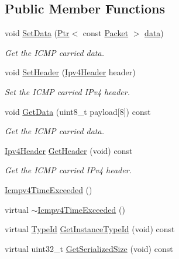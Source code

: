 \subsection*{Public Member Functions}
\begin{DoxyCompactItemize}
\item 
void \hyperlink{classns3_1_1Icmpv4TimeExceeded_ac692eb1bd4b5f80963cd673079a90be5}{Set\+Data} (\hyperlink{classns3_1_1Ptr}{Ptr}$<$ const \hyperlink{classns3_1_1Packet}{Packet} $>$ \hyperlink{topology-example-sim_8cc_a26c65296e316af77b787dc77469bb2a4}{data})
\begin{DoxyCompactList}\small\item\em Get the I\+C\+MP carried data. \end{DoxyCompactList}\item 
void \hyperlink{classns3_1_1Icmpv4TimeExceeded_a52300e282b6dc33501f1cf121480ada7}{Set\+Header} (\hyperlink{classns3_1_1Ipv4Header}{Ipv4\+Header} header)
\begin{DoxyCompactList}\small\item\em Set the I\+C\+MP carried I\+Pv4 header. \end{DoxyCompactList}\item 
void \hyperlink{classns3_1_1Icmpv4TimeExceeded_ad5eb764b95f5c9ebe26ccd1581b1ded8}{Get\+Data} (uint8\+\_\+t payload\mbox{[}8\mbox{]}) const 
\begin{DoxyCompactList}\small\item\em Get the I\+C\+MP carried data. \end{DoxyCompactList}\item 
\hyperlink{classns3_1_1Ipv4Header}{Ipv4\+Header} \hyperlink{classns3_1_1Icmpv4TimeExceeded_a673562f30edc22bbda6d1c9a8d8e2c88}{Get\+Header} (void) const 
\begin{DoxyCompactList}\small\item\em Get the I\+C\+MP carried I\+Pv4 header. \end{DoxyCompactList}\item 
\hyperlink{classns3_1_1Icmpv4TimeExceeded_aaca3df895cb46f2559884ef7841de7b7}{Icmpv4\+Time\+Exceeded} ()
\item 
virtual \hyperlink{classns3_1_1Icmpv4TimeExceeded_a358df777bad04e81ffd6d93b59e66419}{$\sim$\+Icmpv4\+Time\+Exceeded} ()
\item 
virtual \hyperlink{classns3_1_1TypeId}{Type\+Id} \hyperlink{classns3_1_1Icmpv4TimeExceeded_a995e3203f519889bcbc4f58959575fdc}{Get\+Instance\+Type\+Id} (void) const 
\item 
virtual uint32\+\_\+t \hyperlink{classns3_1_1Icmpv4TimeExceeded_a2a5adb85f687301dfe4ec15d09adb73f}{Get\+Serialized\+Size} (void) const 

\end{DoxyCompactItemize}
